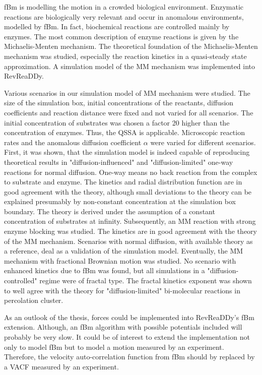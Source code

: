 \documentclass[
  a4paper,BCOR10mm,twoside,
  headsepline,footsepline,%
  fleqn,openbib
]{scrbook}
\begin{document}
fBm is modelling the motion in a crowded biological environment. Enzymatic reactions are biologically very relevant and occur in anomalous environments, modelled by fBm. In fact, biochemical reactions are controlled mainly by enzymes. The most common description of enzyme reactions is given by the Michaelis-Menten mechanism. The theoretical foundation of the Michaelis-Menten mechanism was studied, especially the reaction kinetics in a quasi-steady state approximation. A simulation model of the MM mechanism was implemented into RevReaDDy. 
\par
Various scenarios in our simulation model of MM mechanism were studied. The size of the simulation box, initial concentrations of the reactants, diffusion coefficients and reaction distance were fixed and not varied for all scenarios. The initial concentration of substrates was chosen a factor 20 higher than the concentration of enzymes. Thus, the QSSA is applicable. Microscopic reaction rates and the anomalous diffusion coefficient $\alpha$ were varied for different scenarios. First, it was shown, that the simulation model is indeed capable of reproducing theoretical results in "diffusion-influenced" and "diffusion-limited" one-way reactions for normal diffusion. One-way means no back reaction from the complex to substrate and enzyme. The kinetics and radial distribution function are in good agreement with the theory, although small deviations to the theory can be explained presumably by non-constant concentration at the simulation box boundary. The theory is derived under the assumption of a constant concentration of substrates at infinity. Subsequently, an MM reaction with strong enzyme blocking was studied. The kinetics are in good agreement with the theory of the MM mechanism. Scenarios with normal diffusion, with available theory as a reference, deal as a validation of the simulation model. Eventually, the MM mechanism with fractional Brownian motion was studied. No scenario with enhanced kinetics due to fBm was found, but all simulations in a "diffusion-controlled" regime were of fractal type.  The fractal kinetics exponent was shown to well agree with the theory for "diffusion-limited" bi-molecular reactions in percolation cluster.\par  As an outlook of the thesis, forces could be implemented into RevReaDDy's fBm extension.  Although, an fBm algorithm with possible potentials included will probably be very slow. It could be of interest to extend the implementation not only to model fBm but to model a motion measured by an experiment. Therefore, the velocity auto-correlation function from fBm should by replaced by a VACF measured by an experiment.
\end{document}
